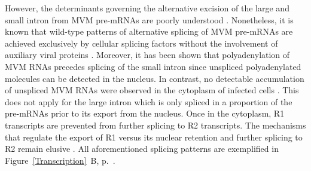 However, the determinants governing the alternative excision of the large and small intron from MVM pre-mRNAs are poorly understood \cite{pmid9499034, pmid10329570, pmid8151756, pmid7666519, pmid7637034, pmid9858560}. Nonetheless, it is known that wild-type patterns of alternative splicing of MVM pre-mRNAs are achieved exclusively by cellular splicing factors without the involvement of auxiliary viral proteins \cite{pmid1592259}. Moreover, it has been shown that polyadenylation of MVM RNAs precedes splicing of the small intron since unspliced polyadenylated molecules can be detected in the nucleus. In contrast, no detectable accumulation of unspliced MVM RNAs were observed in the cytoplasm of infected cells \cite{pmid3346950}. This does not apply for the large intron which is only spliced in a proportion of the pre-mRNAs prior to its export from the nucleus. Once in the cytoplasm, R1 transcripts are prevented from further splicing to R2 transcripts. The mechanisms that regulate the export of R1 versus its nuclear retention and further splicing to R2 remain elusive \cite{Transcription}. All aforementioned splicing patterns are exemplified in Figure~\ref{Transcription}~B, p.~\pageref{Transcription}. 
\clearpage
